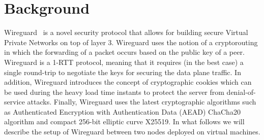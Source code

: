 \section{Background}
\label{section:background}

Wireguard~\cite{wireguard} is a novel security protocol that allows for building secure 
Virtual Private Networks on top of layer 3. Wireguard uses the notion of a cryptorouting 
in which the forwarding of a packet occurs based on the public key of a peer. Wireguard 
is a 1-RTT protocol, meaning that it requires (in the best case) a single round-trip to 
negotiate the keys for securing the data plane traffic. In addition, Wireguard introduces 
the concept of cryptographic cookies which can be used during the heavy load time instants 
to protect the server from denial-of-service attacks. Finally, Wireguard uses the latest 
cryptographic algorithms such as Authenticated Encryption with Authentication Data (AEAD) 
ChaCha20 algorithm and compact 256-bit elliptic curve X25519. In what follows we will 
describe the setup of Wireguard between two nodes deployed on virtual machines.